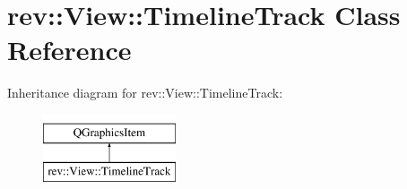 \hypertarget{classrev_1_1_view_1_1_timeline_track}{}\section{rev\+::View\+::Timeline\+Track Class Reference}
\label{classrev_1_1_view_1_1_timeline_track}
Inheritance diagram for rev\+::View\+::Timeline\+Track\+:\begin{figure}[H]
\begin{center}
\leavevmode
\includegraphics[height=2.000000cm]{classrev_1_1_view_1_1_timeline_track}
\end{center}
\end{figure}
